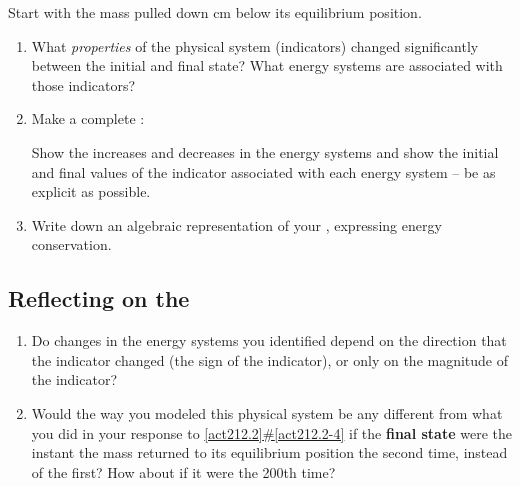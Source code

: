 \noindent Start with the mass pulled down \unit[5]{cm} below its equilibrium position. 

\begin{center}
\end{center}

\begin{enumerate}
	\item What {\em properties} of the physical system (indicators) changed significantly between the initial and final state?  What energy systems are associated with those indicators?
	\label{act212.2-3}
	
	\item Make a complete \EnergyDiagram{}:
	\label{act212.2-4}
		
	Show the increases and decreases in the energy systems and show the initial and final values of the indicator associated with each energy system -- be as explicit as possible.
	
	\item Write down an algebraic representation of your \EnergyDiagram, expressing energy conservation.

\end{enumerate}

\WCD  

\subsection{Reflecting on the \SOModel{}}

\begin{enumerate}
	\item Do changes in the energy systems you identified depend on the direction that the indicator changed (the sign of the indicator), or only on the magnitude of the indicator?
	
	\item Would the way you modeled this physical system be any different from what you did in your response to \hyperref[act212.2-4]{\ref*{act212.2}\#\ref*{act212.2-4}} if the \textbf{final state} were the instant the mass returned to its equilibrium position the second time, instead of the first?  How about if it were the 200th time?
\end{enumerate}

\WCD